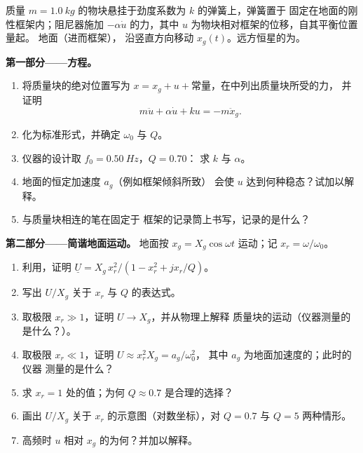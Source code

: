 \begin{problem}
\label{pb:b1:oscillators-resonance:1}
质量 $m = \qty{1.0}{kg}$ 的物块悬挂于劲度系数为 $k$ 的弹簧上，弹簧置于
固定在地面的刚性框架内；阻尼器施加 $-\alpha\dot u$ 的力，其中
$u$ 为物块相对框架的位移，自其平衡位置量起。
地面（进而框架），
沿竖直方向移动 $x_g(t)$。远方恒星的为。

\medskip
\noindent\textbf{第一部分——方程。}
\begin{enumerate}
  \item 将质量块的绝对位置写为 $x = x_g + u +
        \text{常量}$，在中列出质量块所受的力，
        并证明
        \[
        m\ddot u + \alpha\dot u + ku = -m\ddot x_g .
        \]
  \item 化为标准形式，并确定 $\omega_0$ 与 $Q$。
  \item 仪器的设计取 $f_0 = \qty{0.50}{Hz}$，$Q = 0.70$：
        求 $k$ 与 $\alpha$。
  \item 地面的恒定加速度 $a_g$（例如框架倾斜所致）
        会使 $u$ 达到何种稳态？试加以解释。
  \item 与质量块相连的笔在固定于
        框架的记录筒上书写，记录的是什么？
\end{enumerate}

\medskip
\noindent\textbf{第二部分——简谐地面运动。}
地面按 $x_g = X_g\cos\omega t$ 运动；记 $x_r = \omega/\omega_0$。
\begin{enumerate}[resume]
  \item 利用，证明 $\underline U = X_g\,x_r^2/
        (1 - x_r^2 + jx_r/Q)$。
  \item 写出 $U/X_g$ 关于 $x_r$ 与 $Q$ 的表达式。
  \item 取极限 $x_r \gg 1$，证明 $U \to X_g$，并从物理上解释
        质量块的运动（仪器测量的是什么？）。
  \item 取极限 $x_r \ll 1$，证明 $U \approx x_r^2X_g = a_g/\omega_0^2$，
        其中 $a_g$ 为地面加速度的；此时的仪器
        测量的是什么？
  \item 求 $x_r = 1$ 处的值；为何 $Q \approx 0.7$ 是合理的选择？
  \item 画出 $U/X_g$ 关于 $x_r$ 的示意图（对数坐标），对 $Q = 0.7$ 与
        $Q = 5$ 两种情形。
  \item 高频时 $u$ 相对 $x_g$ 的为何？并加以解释。
\end{enumerate}


\end{problem}
